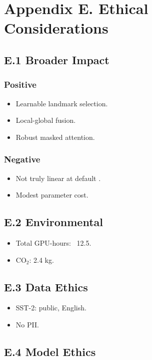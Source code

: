 \section{Appendix E. Ethical Considerations}

\subsection{E.1 Broader Impact}

\subsubsection{Positive}
\begin{itemize}
\item Learnable landmark selection.
\item Local-global fusion.
\item Robust masked attention.

\end{itemize}
\subsubsection{Negative}
\begin{itemize}
\item Not truly linear at default  .
\item Modest parameter cost.

\end{itemize}
\subsection{E.2 Environmental}

\begin{itemize}
\item Total GPU-hours: ~12.5.
\item CO$_2$: 2.4 kg.

\end{itemize}
\subsection{E.3 Data Ethics}

\begin{itemize}
\item SST-2: public, English.
\item No PII.

\end{itemize}
\subsection{E.4 Model Ethics}

